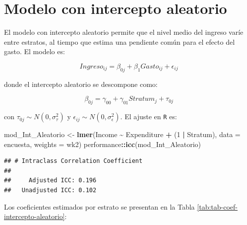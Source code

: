 \documentclass[
  spanish,
  12pt,
]{book}
\newenvironment{Shaded}{\begin{snugshade}}{\end{snugshade}}
\newcommand{\AttributeTok}[1]{\textcolor[rgb]{0.13,0.29,0.53}{#1}}
\newcommand{\DataTypeTok}[1]{\textcolor[rgb]{0.13,0.29,0.53}{#1}}
\newcommand{\DecValTok}[1]{\textcolor[rgb]{0.00,0.00,0.81}{#1}}
\newcommand{\FunctionTok}[1]{\textcolor[rgb]{0.13,0.29,0.53}{\textbf{#1}}}
\newcommand{\NormalTok}[1]{#1}
\newcommand{\OtherTok}[1]{\textcolor[rgb]{0.56,0.35,0.01}{#1}}
\newcommand{\SpecialCharTok}[1]{\textcolor[rgb]{0.81,0.36,0.00}{\textbf{#1}}}
\begin{document}
\section{Modelo con intercepto aleatorio}\label{sec-intercepto-aleatorio}

El modelo con intercepto aleatorio permite que el nivel medio del ingreso varíe entre estratos, al tiempo que estima una pendiente común para el efecto del gasto. El modelo es:

\[
Ingreso_{ij} = \beta_{0j} + \beta_1 Gasto_{ij} + \epsilon_{ij}
\]

donde el intercepto aleatorio se descompone como:

\[
\beta_{0j} = \gamma_{00} + \gamma_{01} Stratum_j + \tau_{0j}
\]

con \(\tau_{0j} \sim N(0, \sigma_\tau^2)\) y \(\epsilon_{ij} \sim N(0, \sigma_\epsilon^2)\). El ajuste en \texttt{R} es:

\begin{Shaded}
\begin{Highlighting}[]
\NormalTok{mod\_Int\_Aleatorio }\OtherTok{\textless{}{-}} \FunctionTok{lmer}\NormalTok{(Income }\SpecialCharTok{\textasciitilde{}}\NormalTok{ Expenditure }\SpecialCharTok{+}\NormalTok{ (}\DecValTok{1} \SpecialCharTok{|}\NormalTok{ Stratum),}
                          \AttributeTok{data =}\NormalTok{ encuesta, }\AttributeTok{weights =}\NormalTok{ wk2)}
\NormalTok{performance}\SpecialCharTok{::}\FunctionTok{icc}\NormalTok{(mod\_Int\_Aleatorio)}
\end{Highlighting}
\end{Shaded}

\begin{verbatim}
## # Intraclass Correlation Coefficient
## 
##     Adjusted ICC: 0.196
##   Unadjusted ICC: 0.102
\end{verbatim}

Los coeficientes estimados por estrato se presentan en la Tabla \ref{tab:tab-coef-intercepto-aleatorio}:

\begin{Shaded}
\end{Shaded}
\end{document}
